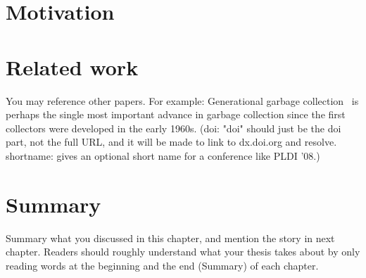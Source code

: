 \section{Motivation}
\label{sec:motivation}


\section{Related work}
\label{sec:relatedwork}
You may reference other papers. For example: 
Generational garbage collection~\citep{LH:83,Moon:84,Ungar:84} is perhaps the
single most important advance in garbage collection since the first collectors
were developed in the early 1960s. (doi: "doi" should just be the doi part, not
the full URL, and it will be made to link to dx.doi.org and resolve.
shortname: gives an optional short name for a conference like PLDI '08.)





\section{Summary}
Summary what you discussed in this chapter, and mention the story in next
chapter. Readers should roughly understand what your thesis takes about by only reading
words at the beginning and the end (Summary) of each chapter.



